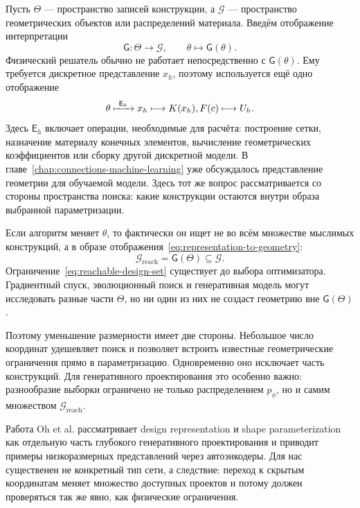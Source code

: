 Пусть $\Theta$ --- пространство записей конструкции, а $\mathcal G$ --- пространство геометрических объектов или распределений материала. Введём отображение интерпретации
\begin{equation}
\label{eq:representation-to-geometry}
 \mathsf G:\Theta\longrightarrow\mathcal G,
 \qquad
 \theta\longmapsto \mathsf G(\theta).
\end{equation}
Физический решатель обычно не работает непосредственно с $\mathsf G(\theta)$. Ему требуется дискретное представление $x_h$, поэтому используется ещё одно отображение
\begin{equation}
 \theta
 \xmapsto{\ \mathsf E_h\ }
 x_h
 \longmapsto
 K(x_h),F(c)
 \longmapsto
 U_h.
\end{equation}
Здесь $\mathsf E_h$ включает операции, необходимые для расчёта: построение сетки, назначение материалу конечных элементов, вычисление геометрических коэффициентов или сборку другой дискретной модели. В главе~\ref{chap:connections-machine-learning} уже обсуждалось представление геометрии для обучаемой модели. Здесь тот же вопрос рассматривается со стороны пространства поиска: какие конструкции остаются внутри образа выбранной параметризации.

Если алгоритм меняет $\theta$, то фактически он ищет не во всём множестве мыслимых конструкций, а в образе отображения~\eqref{eq:representation-to-geometry}:
\begin{equation}
\label{eq:reachable-design-set}
 \mathcal G_{\mathrm{reach}}
 =
 \mathsf G(\Theta)
 \subseteq
 \mathcal G.
\end{equation}
Ограничение~\eqref{eq:reachable-design-set} существует до выбора оптимизатора. Градиентный спуск, эволюционный поиск и генеративная модель могут исследовать разные части $\Theta$, но ни один из них не создаст геометрию вне $\mathsf G(\Theta)$.

Поэтому уменьшение размерности имеет две стороны. Небольшое число координат удешевляет поиск и позволяет встроить известные геометрические ограничения прямо в параметризацию. Одновременно оно исключает часть конструкций. Для генеративного проектирования это особенно важно: разнообразие выборки ограничено не только распределением $p_\phi$, но и самим множеством $\mathcal G_{\mathrm{reach}}$.

Работа Oh et al. рассматривает design representation и shape parameterization как отдельную часть глубокого генеративного проектирования и приводит примеры низкоразмерных представлений через автоэнкодеры. Для нас существенен не конкретный тип сети, а следствие: переход к скрытым координатам меняет множество доступных проектов и потому должен проверяться так же явно, как физические ограничения.

